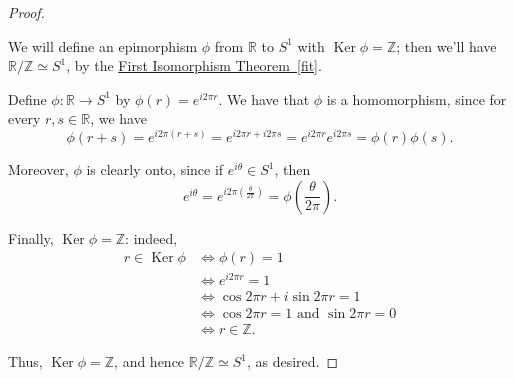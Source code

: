 \documentclass[10pt,]{book}
\theoremstyle{plain}
\theoremstyle{definition}
\theoremstyle{definition}
\theoremstyle{definition}
\theoremstyle{definition}
\numberwithin{equation}{section}
\def\Z{\mathbb{Z}}
\def\R{\mathbb{R}}
\DeclareMathOperator{\Ker}{Ker}
\newcommand{\amp}{&}
\begin{document}
\begin{proof}\hypertarget{proof-54}{}
We will define an epimorphism \(\phi\) from \(\R\) to \(S^1\) with \(\Ker \phi=\Z\); then we'll have \(\R/\Z \simeq S^1\), by the \hyperref[fit]{First Isomorphism Theorem~\ref{fit}}.%
\par
Define \(\phi:\R \to S^1\) by \(\phi(r)=e^{i2\pi r}\). We have that \(\phi\) is a homomorphism, since for every \(r,s\in \R\), we have%
\begin{equation*}
\phi(r+s)=e^{i2\pi (r+s)}=e^{i2\pi r+i2\pi s}=e^{i2\pi
r}e^{i2\pi s}=\phi(r)\phi(s).
\end{equation*}
%
\par
Moreover, \(\phi\) is clearly onto, since if \(e^{i\theta}\in S^1\), then%
\begin{equation*}
e^{i\theta}=e^{i2\pi\left(\frac{\theta}{2\pi}\right)}=\phi\left(\frac{\theta}{2\pi}\right).
\end{equation*}
%
\par
Finally, \(\Ker\phi=\Z\): indeed,%
\begin{align*}
r\in \Ker\phi \amp \Leftrightarrow \phi(r)=1\\
\amp \Leftrightarrow e^{i2\pi r}=1\\
\amp \Leftrightarrow \cos 2\pi r + i\sin 2\pi r=1\\
\amp \Leftrightarrow \cos 2\pi r = 1 \mbox{ and } \sin 2\pi r = 0\\
\amp \Leftrightarrow r\in \Z.
\end{align*}
%
\par
Thus, \(\Ker \phi = \Z\), and hence \(\R/\Z\simeq S^1\), as desired.%
\end{proof}
\typeout{************************************************}
\typeout{************************************************}
\end{document}
